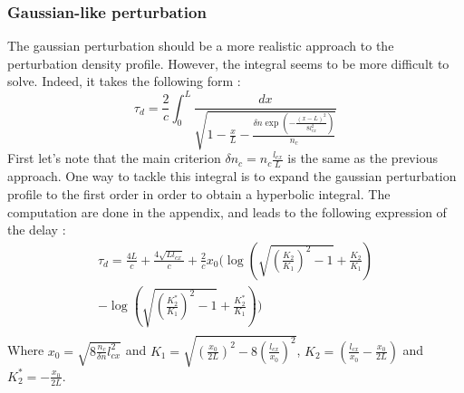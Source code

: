 \documentclass[11pt,a4paper]{report}
\begin{document}
\begin{multicols}{2}
    \subsubsection{Gaussian-like perturbation}
    The gaussian perturbation should be a more realistic approach to the perturbation density profile. However, the integral seems to be more difficult to solve. Indeed, it takes the following form :
    $$\tau_d = \frac{2}{c} \int_0^L \frac{dx}{\sqrt{1 - \frac{x}{L} - \frac{\delta n\exp(-\frac{(x - L)^2}{8l_{cx}^2})}{n_c}}}$$
    First let's note that the main criterion $\delta n_c = n_c \frac{l_{cx}}{L}$ is the same as the previous approach.  One way to tackle this integral is to expand the gaussian perturbation profile to the first order in order to obtain a hyperbolic integral. The computation are done in the appendix, and leads to the following expression of the delay :
    \begin{multline*}
        \tau_d = \frac{4L}{c} + \frac{4\sqrt{Ll_{cx}}}{c} + \frac{2}{c} x_0 (\log \left( \sqrt{(\frac{K_2}{K_1})^2 - 1} + \frac{K_2}{K_1}\right)    \\
        - \log \left( \sqrt{(\frac{K_2^*}{K_1})^2 - 1} + \frac{K_2^*}{K_1}\right)) \\
    \end{multline*}
    Where $x_0 = \sqrt{8\frac{n_c}{\delta n}l_{cx}^2}$ and $K_1 = \sqrt{\left(\frac{x_0}{2L}\right)^2 - 8 \left(\frac{l_{cx}}{x_0} \right)^2}$, $K_2 = \left(\tfrac{l_{cx}}{x_0} - \tfrac{x_0}{2L}\right)$ and $K_2^* = -\tfrac{x_0}{2L}$.

\end{multicols}
\end{document}
